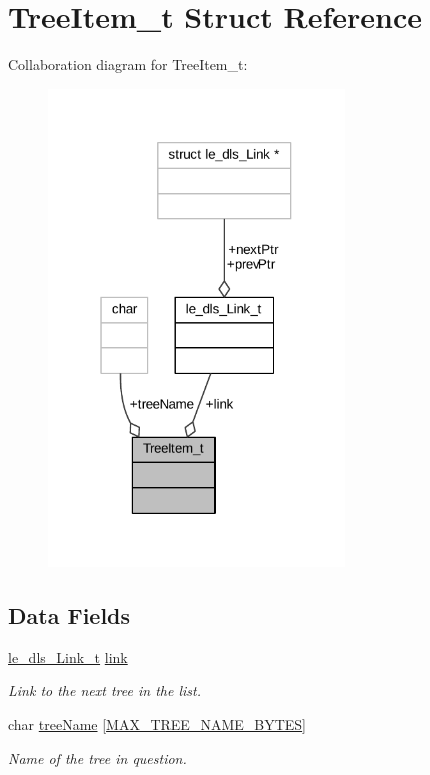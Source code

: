 \hypertarget{struct_tree_item__t}{}\section{Tree\+Item\+\_\+t Struct Reference}
\label{struct_tree_item__t}


Collaboration diagram for Tree\+Item\+\_\+t\+:
\nopagebreak
\begin{figure}[H]
\begin{center}
\leavevmode
\includegraphics[width=223pt]{struct_tree_item__t__coll__graph}
\end{center}
\end{figure}
\subsection*{Data Fields}
\begin{DoxyCompactItemize}
\item 
\hyperlink{structle__dls___link__t}{le\+\_\+dls\+\_\+\+Link\+\_\+t} \hyperlink{struct_tree_item__t_af173615de9036966192a6c596883a4b8}{link}
\begin{DoxyCompactList}\small\item\em Link to the next tree in the list. \end{DoxyCompactList}\item 
char \hyperlink{struct_tree_item__t_a0aaca769d9960e2506d2a303afd010e0}{tree\+Name} \mbox{[}\hyperlink{config_8c_ad0a6139c4ad7feceb227a5a6aa419954}{M\+A\+X\+\_\+\+T\+R\+E\+E\+\_\+\+N\+A\+M\+E\+\_\+\+B\+Y\+T\+ES}\mbox{]}
\begin{DoxyCompactList}\small\item\em Name of the tree in question. \end{DoxyCompactList}\end{DoxyCompactItemize}


